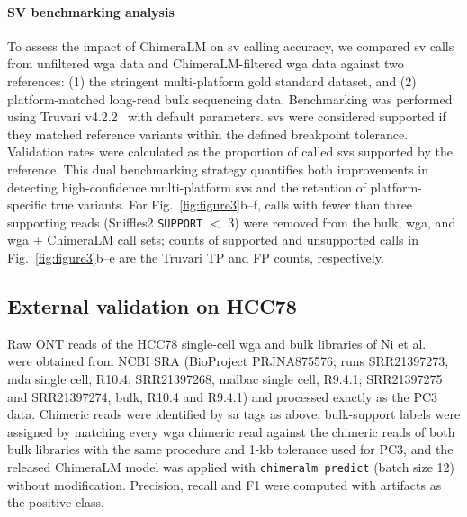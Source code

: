 \documentclass[pdflatex,lineno]{sn-jnl}%
\newif\ifrevisedtext
\newcommand{\chg}[1]{\ifrevisedtext\textcolor{revcolor}{#1}\else#1\fi}
\begin{document}
\paragraph{SV benchmarking analysis}
To assess the impact of ChimeraLM on \gls{sv} calling accuracy, we compared \gls{sv} calls from unfiltered \gls{wga} data and ChimeraLM-filtered \gls{wga} data against two references: (1) the stringent multi-platform gold standard dataset, and (2) platform-matched long-read bulk sequencing data.
Benchmarking was performed using Truvari v4.2.2~\cite{english2022truvari} with default parameters.
\glspl{sv} were considered supported if they matched reference variants within the defined breakpoint tolerance.
Validation rates were calculated as the proportion of called \glspl{sv} supported by the reference.
This dual benchmarking strategy quantifies both improvements in detecting high-confidence multi-platform \glspl{sv} and the retention of platform-specific true variants.
\chg{For Fig.~\ref{fig:figure3}b--f, calls with fewer than three supporting reads (Sniffles2 \texttt{SUPPORT} $<$ 3) were removed from the bulk, \gls{wga}, and \gls{wga} + ChimeraLM call sets; counts of supported and unsupported calls in Fig.~\ref{fig:figure3}b--e are the Truvari TP and FP counts, respectively.}

\subsection*{\chg{External validation on HCC78}}
\chg{Raw ONT reads of the HCC78 single-cell \gls{wga} and bulk libraries of Ni et al.~\cite{ni2023benchmarking} were obtained from NCBI SRA (BioProject PRJNA875576; runs SRR21397273, \gls{mda} single cell, R10.4; SRR21397268, \gls{malbac} single cell, R9.4.1; SRR21397275 and SRR21397274, bulk, R10.4 and R9.4.1) and processed exactly as the PC3 data.
	Chimeric reads were identified by \gls{sa} tags as above, bulk-support labels were assigned by matching every \gls{wga} chimeric read against the chimeric reads of both bulk libraries with the same procedure and 1-kb tolerance used for PC3, and the released ChimeraLM model was applied with \texttt{chimeralm predict} (batch size 12) without modification. Precision, recall and F1 were computed with artifacts as the positive class.}
\end{document}
